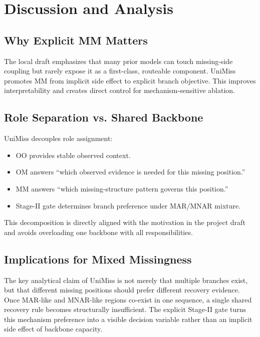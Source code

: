 \section{Discussion and Analysis}

\subsection{Why Explicit MM Matters}
The local draft emphasizes that many prior models can touch missing-side coupling but rarely expose it as a first-class, routeable component. UniMiss promotes MM from implicit side effect to explicit branch objective. This improves interpretability and creates direct control for mechanism-sensitive ablation.

\subsection{Role Separation vs. Shared Backbone}
UniMiss decouples role assignment:
\begin{itemize}
\item OO provides stable observed context.
\item OM answers ``which observed evidence is needed for this missing position.''
\item MM answers ``which missing-structure pattern governs this position.''
\item Stage-II gate determines branch preference under MAR/MNAR mixture.
\end{itemize}
This decomposition is directly aligned with the motivation in the project draft and avoids overloading one backbone with all responsibilities.

\subsection{Implications for Mixed Missingness}
The key analytical claim of UniMiss is not merely that multiple branches exist, but that different missing positions should prefer different recovery evidence. Once MAR-like and MNAR-like regions co-exist in one sequence, a single shared recovery rule becomes structurally insufficient. The explicit Stage-II gate turns this mechanism preference into a visible decision variable rather than an implicit side effect of backbone capacity.
